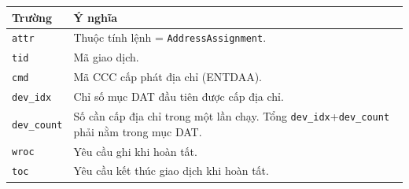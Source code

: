 \begin{longtable}{C{3.6cm} L{9.0cm}}
	\toprule
	\textbf{Trường}     & \textbf{Ý nghĩa}                                                                                                                \\
	\midrule
	\endhead
	\texttt{attr}       & Thuộc tính lệnh = \texttt{AddressAssignment}.                                                                                   \\
	\texttt{tid}        & Mã giao dịch.                                                                                                                   \\
	\texttt{cmd}        & Mã CCC cấp phát địa chỉ (ENTDAA).                                                                                               \\
	\texttt{dev\_idx}   & Chỉ số mục DAT đầu tiên được cấp địa chỉ.                                                                                       \\
	\texttt{dev\_count} & Số \Target{} cần cấp địa chỉ trong một lần chạy. Tổng \texttt{dev\_idx}+\texttt{dev\_count} phải nằm trong \DatEntryCount{} mục DAT. \\
	\texttt{wroc}       & Yêu cầu ghi \ResponseDescriptor{} khi hoàn tất.                                                                                 \\
	\texttt{toc}        & Yêu cầu kết thúc giao dịch khi hoàn tất.                                                                                        \\
	\bottomrule
\end{longtable}
